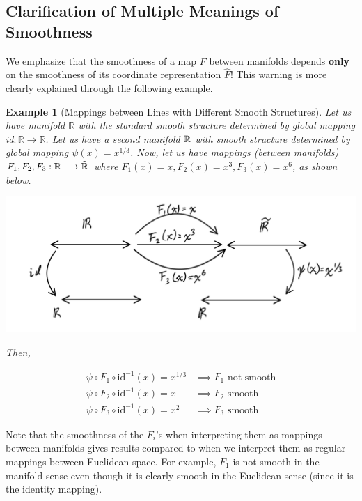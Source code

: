 \documentclass{article}
\newtheorem{example}{Example}[section]
\theoremstyle{remark}
\theoremstyle{definition}
\begin{document}
  \subsection{Clarification of Multiple Meanings of Smoothness}

    We emphasize that the smoothness of a map $F$ between manifolds depends \textbf{only} on the smoothness of its coordinate representation $\hat{F}$! This warning is more clearly explained through the following example. 

    \begin{example}[Mappings between Lines with Different Smooth Structures]
      Let us have manifold $\mathbb{R}$ with the standard smooth structure determined by global mapping id$: \mathbb{R} \longrightarrow \mathbb{R}$. Let us have a second manifold $\Tilde{\mathbb{R}}$ with smooth structure determined by global mapping $\psi(x) = x^{1/3}$. Now, let us have mappings (between manifolds) $F_1, F_2, F_3: \mathbb{R} \longrightarrow \Tilde{\mathbb{R}}$ where $F_1 (x) = x, F_2 (x) = x^3, F_3(x) = x^6$, as shown below. 

      \begin{center}
        \includegraphics[scale=0.25]{img/Real_Line_Manifold_Functions.PNG}
      \end{center}

      Then,

      \begin{align*}
        \psi \circ F_1 \circ \text{id}^{-1} (x)= x^{1/3} & \implies F_1 \text{ not smooth} \\
        \psi \circ F_2 \circ \text{id}^{-1}(x) = x & \implies F_2 \text{ smooth} \\
        \psi \circ F_3 \circ \text{id}^{-1}(x) = x^{2} & \implies F_3 \text{ smooth} 
      \end{align*}
    \end{example}

    Note that the smoothness of the $F_i$'s when interpreting them as mappings between manifolds gives results compared to when we interpret them as regular mappings between Euclidean space. For example, $F_1$ is not smooth in the manifold sense even though it is clearly smooth in the Euclidean sense (since it is the identity mapping).  
\end{document}

